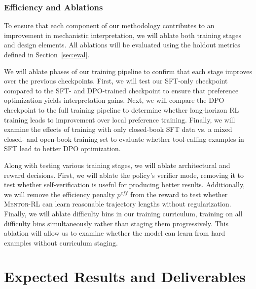 \documentclass[thesis,letterpaper,12pt]{utthesis}
\begin{document}
\subsubsection{Efficiency and Ablations}
To ensure that each component of our methodology contributes to an improvement in mechanistic interpretation, we will ablate both training stages and design elements. All ablations will be evaluated using the holdout metrics defined in Section~\ref{sec:eval}.

We will ablate phases of our training pipeline to confirm that each stage improves over the previous checkpoints. First, we will test our SFT-only checkpoint compared to the SFT- and DPO-trained checkpoint to ensure that preference optimization yields interpretation gains. Next, we will compare the DPO checkpoint to the full training pipeline to determine whether long-horizon RL training leads to improvement over local preference training. Finally, we will examine the effects of training with only closed-book SFT data vs. a mixed closed- and open-book training set to evaluate whether tool-calling examples in SFT lead to better DPO optimization.

Along with testing various training stages, we will ablate architectural and reward decisions. First, we will ablate the policy's verifier mode, removing it to test whether self-verification is useful for producing better results. Additionally, we will remove the efficiency penalty $p^{eff}$ from the reward to test whether \textsc{Mentor-RL} can learn reasonable trajectory lengths without regularization. Finally, we will ablate difficulty bins in our training curriculum, training on all difficulty bins simultaneously rather than staging them progressively. This ablation will allow us to examine whether the model can learn from hard examples without curriculum staging.

\section{Expected Results and Deliverables}
\end{document}
